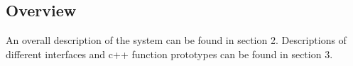 
\subsection{Overview}

An overall description of the system can be found in section
2. Descriptions of different interfaces and c++ function
prototypes can be found in section 3.

